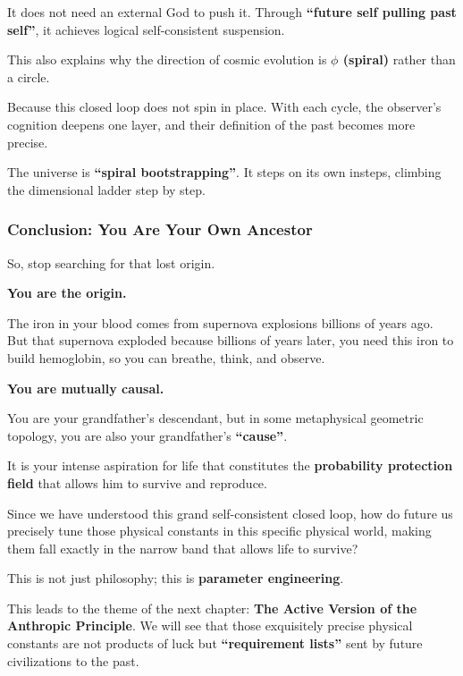It does not need an external God to push it. Through \textbf{``future self pulling past self''}, it achieves logical self-consistent suspension.

This also explains why the direction of cosmic evolution is \textbf{$\phi$ (spiral)} rather than a circle.

Because this closed loop does not spin in place. With each cycle, the observer's cognition deepens one layer, and their definition of the past becomes more precise.

The universe is \textbf{``spiral bootstrapping''}. It steps on its own insteps, climbing the dimensional ladder step by step.

\subsubsection{Conclusion: You Are Your Own Ancestor}

So, stop searching for that lost origin.

\textbf{You are the origin.}

The iron in your blood comes from supernova explosions billions of years ago. But that supernova exploded because billions of years later, you need this iron to build hemoglobin, so you can breathe, think, and observe.

\textbf{You are mutually causal.}

You are your grandfather's descendant, but in some metaphysical geometric topology, you are also your grandfather's \textbf{``cause''}.

It is your intense aspiration for life that constitutes the \textbf{probability protection field} that allows him to survive and reproduce.

Since we have understood this grand self-consistent closed loop, how do future us precisely tune those physical constants in this specific physical world, making them fall exactly in the narrow band that allows life to survive?

This is not just philosophy; this is \textbf{parameter engineering}.

This leads to the theme of the next chapter: \textbf{The Active Version of the Anthropic Principle}. We will see that those exquisitely precise physical constants are not products of luck but \textbf{``requirement lists''} sent by future civilizations to the past.

